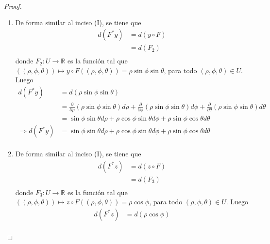 \documentclass[12pt]{report}
\theoremstyle{largebreak}
\newcommand\cf[3]{\ensuremath{#1:#2\rightarrow#3}}
\begin{document}
\begin{proof}
\begin{enumerate}
            \item De forma similar al inciso (I), se tiene que
            \begin{equation*}
                \begin{split}
                    d(F^*y)&=d(y\circ F)\\
                    &=d(F_2)\\
                \end{split}
            \end{equation*}
            donde $\cf{F_2}{U}{\mathbb{R}}$ es la función tal que $((\rho,\phi,\theta))\mapsto y\circ F((\rho,\phi,\theta))=\rho\sin\phi \sin\theta$, para todo $(\rho,\phi,\theta)\in U$. Luego
            \begin{equation*}
                \begin{split}
                    d(F^*y)&=d(\rho\sin\phi\sin\theta)\\
                    &=\frac{\partial}{\partial\rho}(\rho\sin\phi\sin\theta)d\rho+\frac{\partial}{\partial\phi}(\rho\sin\phi\sin\theta)d\phi+\frac{\partial}{\partial\theta}(\rho\sin\phi\sin\theta)d\theta\\
                    &=\sin\phi\sin\theta d\rho+\rho\cos\phi\sin\theta d\phi+\rho\sin\phi\cos\theta d\theta\\
                    \Rightarrow d(F^*y)&=\sin\phi\sin\theta d\rho+\rho\cos\phi\sin\theta d\phi+\rho\sin\phi\cos\theta d\theta\\
                \end{split}
            \end{equation*}
            \item De forma similar al inciso (I), se tiene que
            \begin{equation*}
                \begin{split}
                    d(F^*z)&=d(z\circ F)\\
                    &=d(F_3)\\
                \end{split}
            \end{equation*}
            donde $\cf{F_3}{U}{\mathbb{R}}$ es la función tal que $((\rho,\phi,\theta))\mapsto z\circ F((\rho,\phi,\theta))=\rho\cos\phi$, para todo $(\rho,\phi,\theta)\in U$. Luego
            \begin{equation*}
                \begin{split}
                    d(F^*z)&=d(\rho\cos\phi)\\

\end{split}
\end{equation*}
\end{enumerate}
\end{proof}
\end{document}
